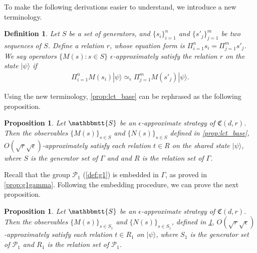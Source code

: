 \documentclass[11pt,letterpaper]{article}
\newcommand{\ket}[1]{|#1\rangle}
\newcommand{\1}{\mathbb{1}}
\newcommand{\Pg}{\mathcal{P}}
\newcommand{\fC}{\mathfrak{C}}
\newcommand{\bS}{\mathbbmtt{S}}
\newcommand{\ep}{\epsilon}
\newcommand{\se}{\sqrt{\epsilon}}
\newcommand{\sr}{\sqrt{r}}
\newcommand{\appd}[1]{\simeq_{#1}}
\newtheorem{proposition}[theorem]{Proposition}
\newtheorem{definition}[theorem]{Definition}
\theoremstyle{definition}
\begin{document}
To make the following derivations easier to understand, 
we introduce a new terminology.
\begin{definition}
    Let $S$ be a set of generators, and $\{s_i\}_{i=1}^n$ and $\{s'_j\}_{j=1}^m$
    be two sequences of $S$.
    Define a relation $r$, whose equation form is $\Pi_{i=1}^n s_i = \Pi_{j=1}^m s'_j$.
    We say operators $\{M(s) : s \in S\}$ $\ep$-approximately satisfy the relation
    $r$ on the state $\ket{\psi}$ if 
    \begin{align*}
        \Pi_{i=1}^n M(s_i)\ket{\psi} \appd{\ep} \Pi_{j=1}^m M(s'_j) \ket{\psi}. 
    \end{align*}
\end{definition}
Using the new terminology, \cref{prop:lct_base} can be rephrased 
as the following proposition.
\begin{proposition}
    \label{prop:lct_group}
    Let $\bS$ be an $\ep$-approximate strategy of $\fC(d,r)$.
	Then the observables $\{ M(s) \}_{s \in S}$ and
	$\{N(s)\}_{s \in S}$ defined in \cref{prop:lct_base}, 
	$O(\sr \se)$-approximately satisfy
	each relation $t \in R$ on the shared state $\ket{\psi}$, 
	where $S$ is the generator set of
	$\Gamma$ and
	and $R$ is the relation set of $\Gamma$.	
\end{proposition}
Recall that the group $\Pg_1$ (\cref{def:g1}) is embedded in $\Gamma$,
as proved in \cref{prop:g1gamma}. 
Following the embedding procedure, we can prove the next proposition.
\begin{proposition}
    \label{prop:lct_pg1}
    Let $\bS$ be an $\ep$-approximate strategy of $\fC(d,r)$.
	Then the observables $\{ M(s) \}_{s \in S_1}$ and
	$\{N(s)\}_{s \in S_1}$, defined in 
\cref{prop:lct_group}, $O(\sr\se)$-approximately satisfy
	each relation $t \in R_1$ on $\ket{\psi}$, 
	where $S_1$ is the generator set of $\Pg_1$
    and $R_1$ is the relation set of $\Pg_1$.
\end{proposition}
\end{document}
